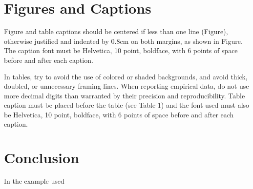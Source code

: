 \documentclass[12pt]{article}
\begin{document}
\section{Figures and Captions}\label{sec:figs}


Figure and table captions should be centered if less than one line
(Figure), otherwise justified and indented by 0.8cm on
both margins, as shown in Figure. The caption font must
be Helvetica, 10 point, boldface, with 6 points of space before and after each
caption.

In tables, try to avoid the use of colored or shaded backgrounds, and avoid
thick, doubled, or unnecessary framing lines. When reporting empirical data,
do not use more decimal digits than warranted by their precision and
reproducibility. Table caption must be placed before the table (see Table 1)
and the font used must also be Helvetica, 10 point, boldface, with 6 points of
space before and after each caption.
 

\section{Conclusion}

In the example used \cite{smith:99}




\end{document}
